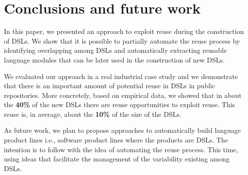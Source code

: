 \section{Conclusions and future work}
\label{sec:conclusions}
In this paper, we presented an approach to exploit reuse during the construction of DSLs. We show that it is possible to partially automate the reuse process by identifying overlapping among DSLs and automatically extracting reusable language modules that can be later used in the construction of new DSLs.

We evaluated our approach in a real industrial case study and we demonstrate that there is an important amount of potential reuse in DSLs in public repositories. More concretely, based on empirical data, we showed that in about the \textbf{40\%} of the new DSLs there are reuse opportunities to exploit reuse. This reuse is, in average, about the \textbf{10\%} of the size of the DSLs. 

As future work, we plan to propose approaches to automatically build language product lines i.e., software product lines where the products are DSLs. The intention is to follow with the idea of automating the reuse process. This time, using ideas that facilitate the management of the variability existing among DSLs. 